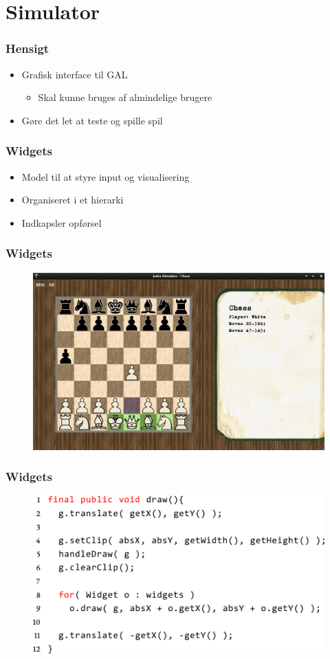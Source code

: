 \section{Simulator}

\begin{frame}
  \frametitle{Hensigt}

  \begin{itemize}
    \item Grafisk interface til GAL
	   \begin{itemize}
		  \item Skal kunne bruges af almindelige brugere
	   \end{itemize}
	 \item Gøre det let at teste og spille spil
  \end{itemize}
\end{frame}

\begin{frame}
  \frametitle{Widgets}

  \begin{itemize}
    \item Model til at styre input og visualisering
	 \item Organiseret i et hierarki
	 \item Indkapsler opførsel
  \end{itemize}
\end{frame}

\begin{frame}
  \frametitle{Widgets}

 	\begin{figure}
    	\includegraphics[width=0.8\linewidth]{billeder/simulator.png}
 	\end{figure}
\end{frame}

\begin{frame}
  \frametitle{Widgets}

 	\begin{figure}
    	\includegraphics[width=0.8\linewidth]{billeder/widgets_draw_code.png}
 	\end{figure}
\end{frame}
